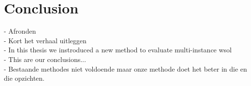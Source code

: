\chapter{Conclusion}


-	Afronden \\
-	Kort het verhaal uitleggen \\
-	In this thesis we instroduced a new method to evaluate multi-instance wsol \\
-	This are our conclusions... \\
-	Bestaande methodes niet voldoende maar onze methode doet het beter in die en die opzichten. \\